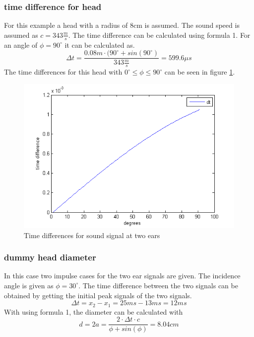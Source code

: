 \documentclass{article}
\begin{document}
\subsubsection{time difference for head}
For this example a head with a radius of 8cm is assumed. The sound speed is assumed as $c=343\frac{m}{s}$. The time difference can be calculated using formula 1. For an angle of $\phi=90^\circ$ it can be calculated as.
$$\Delta t=\frac{0.08m\cdot(90^\circ+sin(90^\circ)}{343\frac{m}{s}}=599.6\mu s$$
The time differences for this head with $0^\circ\leq\phi\leq 90^\circ$ can be seen in figure \ref{fig:angles}.
\begin{figure}[htbp]
\begin{center}
\includegraphics[width=15cm,keepaspectratio=true]{angles}
\caption{Time differences for sound signal at two ears}
\label{fig:angles}
\end{center}
\end{figure}
\subsubsection{dummy head diameter}
In this case two impulse cases for the two ear signals are given. The incidence angle is given as $\phi=30^\circ$. The time difference between the two signals can be obtained by getting the initial peak signals of the two signals.
$$\Delta t=x_2-x_1=25ms-13ms=12ms$$
With using formula 1, the diameter can be calculated with
$$d=2a=\frac{2\cdot\Delta t\cdot c}{\phi+sin(\phi)}=8.04cm$$
\end{document}
